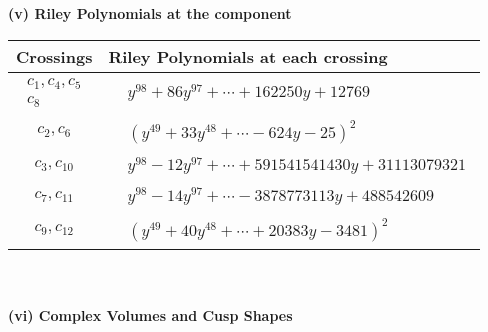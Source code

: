 \documentclass[1p]{elsarticle_modified}
\theoremstyle{definition}
\begin{document}
\newpage\renewcommand{\arraystretch}{1}
\flushleft \textbf{(v) Riley Polynomials at the component}\newline \\
\begin{tabular}{m{50pt}|m{274pt}}
Crossings & \hspace{64pt}Riley Polynomials at each crossing \\
\hline $$\begin{aligned}c_{1},c_{4},c_{5}\\c_{8}\end{aligned}$$&$\begin{aligned}
&y^{98}+86 y^{97}+\cdots+162250 y+12769
\end{aligned}$\\
\hline $$\begin{aligned}c_{2},c_{6}\end{aligned}$$&$\begin{aligned}
&(y^{49}+33 y^{48}+\cdots-624 y-25)^{2}
\end{aligned}$\\
\hline $$\begin{aligned}c_{3},c_{10}\end{aligned}$$&$\begin{aligned}
&y^{98}-12 y^{97}+\cdots+591541541430 y+31113079321
\end{aligned}$\\
\hline $$\begin{aligned}c_{7},c_{11}\end{aligned}$$&$\begin{aligned}
&y^{98}-14 y^{97}+\cdots-3878773113 y+488542609
\end{aligned}$\\
\hline $$\begin{aligned}c_{9},c_{12}\end{aligned}$$&$\begin{aligned}
&(y^{49}+40 y^{48}+\cdots+20383 y-3481)^{2}
\end{aligned}$\\
\hline
\end{tabular}\\~\\
\newpage\flushleft \textbf{(vi) Complex Volumes and Cusp Shapes}
\end{document}
